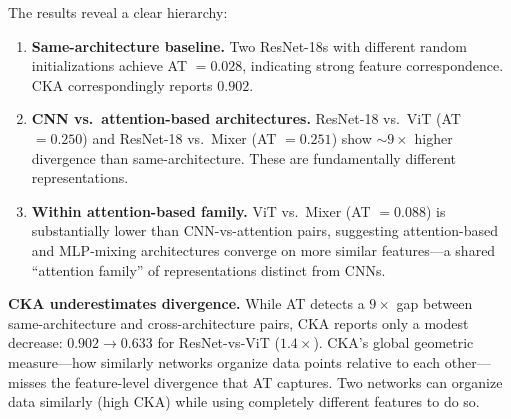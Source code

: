 \documentclass{article}
\begin{document}
The results reveal a clear hierarchy:

\begin{enumerate}
    \item \textbf{Same-architecture baseline.} Two ResNet-18s with different random initializations achieve AT $= 0.028$, indicating strong feature correspondence. CKA correspondingly reports $0.902$.
    \item \textbf{CNN vs.\ attention-based architectures.} ResNet-18 vs.\ ViT (AT $= 0.250$) and ResNet-18 vs.\ Mixer (AT $= 0.251$) show ${\sim}9\times$ higher divergence than same-architecture. These are fundamentally different representations.
    \item \textbf{Within attention-based family.} ViT vs.\ Mixer (AT $= 0.088$) is substantially lower than CNN-vs-attention pairs, suggesting attention-based and MLP-mixing architectures converge on more similar features---a shared ``attention family'' of representations distinct from CNNs.
\end{enumerate}

\textbf{CKA underestimates divergence.} While AT detects a $9\times$ gap between same-architecture and cross-architecture pairs, CKA reports only a modest decrease: $0.902 \to 0.633$ for ResNet-vs-ViT ($1.4\times$). CKA's global geometric measure---how similarly networks organize data points relative to each other---misses the feature-level divergence that AT captures. Two networks can organize data similarly (high CKA) while using completely different features to do so.
\end{document}
